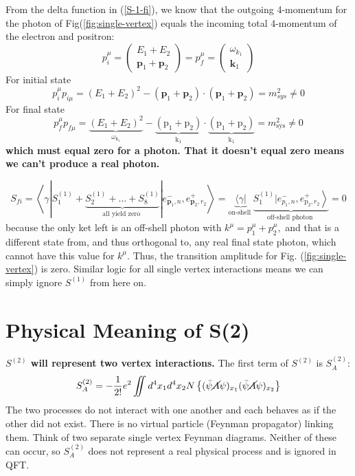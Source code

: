 From the delta function in (\ref{S-1-fi}), we know that the outgoing 4-momentum for the photon of Fig(\ref{fig:single-vertex}) equals the incoming total 4-momentum of the electron and positron:
$$
p_{i}^{\mu}=\left(\begin{array}{l}
{E_{1}+E_{2}} \\
{\mathbf{p}_{1}+\mathbf{p}_{2}}
\end{array}\right)=p_{f}^{\mu}=\left(\begin{array}{c}
{\omega_{k_{1}}} \\
{\mathbf{k}_{1}}
\end{array}\right)
$$
For initial state
$$
p_{i}^{\mu} p_{i \mu}=\left(E_{1}+E_{2}\right)^{2}-\left(\mathbf{p}_{1}+\mathbf{p}_{2}\right) \cdot\left(\mathbf{p}_{1}+\mathbf{p}_{2}\right)=m_{s y s}^{2} \neq 0
$$
For final state
$$
p_{f}^{\mu} p_{f \mu}=\underbrace{\left(E_{1}+E_{2}\right)^{2}}_{\omega_{\mathrm{k}_{1}}}-\underbrace{\left(\mathrm{p}_{1}+\mathrm{p}_{2}\right)}_{\mathrm{k}_{1}} \cdot \underbrace{\left(\mathrm{p}_{1}+\mathrm{p}_{2}\right)}_{\mathrm{k}_{1}}=m_{\mathrm{sys}}^{2} \neq 0
$$
\textbf{which must equal zero for a photon. That it doesn't equal zero means we can't produce a real photon.}
\begin{qt}
    $$
S_{f i}=\left\langle\gamma\left|S_{1}^{(1)} +\underbrace{S_{2}^{(1)}+\ldots+S_{8}^{(1)}}_{\text {all yield zero }}\right| e_{\mathbf{p}_{1}, n}^{-}, e_{\mathbf{p}_{2}, r_{2}}^{+}\right\rangle=\underbrace{\langle\gamma|}_{\text {on-shell }} \underbrace{\left.S_{1}^{(1)} | e_{p_{1}, n}^{-}, e^{+}_{\mathrm{p}_{2}, r_{2}}\right\rangle}_{\text {off-shell photon }}=0
$$
because the only ket left is an off-shell photon with $k^{\mu}=p_{1}^{\mu}+p_{2}^{\mu},$ and that is a different state from, and thus orthogonal to, any real final state photon, which cannot have this value for $k^{\mu} .$ Thus, the transition amplitude for Fig. (\ref{fig:single-vertex}) is zero. Similar logic for all single vertex interactions means we can simply ignore $S^{(1)}$ from here on.
\end{qt}
\section{Physical Meaning of S(2)}
\textbf{$S^{(2)}$ will represent two vertex interactions.} The first term of $S^{(2)}$ is $S_A^{(2)}$:
$$
S_{A}^{(2)}=-\frac{1}{2 !} e^{2} \iint d^{4} x_{1} d^{4} x_{2} N\left\{(\bar{\psi} \cancel{A} \psi)_{x_{1}}(\bar{\psi} \cancel{A} \psi)_{x_{2}}\right\}
$$
\textbf{} The two processes
do not interact with one another and each behaves as if the other did not exist. There is no virtual particle (Feynman propagator) linking them. Think of two separate single vertex Feynman diagrams. Neither of these can occur, so $S_A^{(2)}$ does not represent a real physical process and is ignored in QFT.

